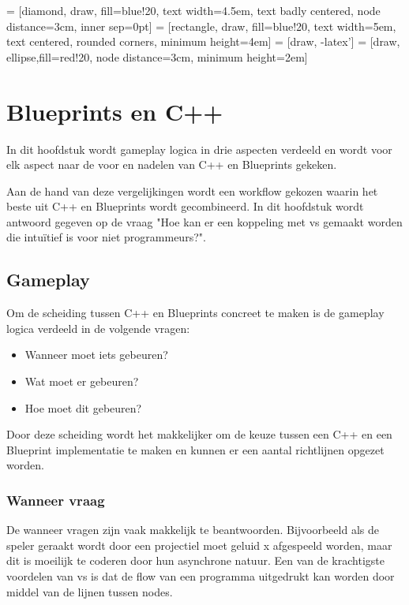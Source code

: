 \lstset {language=C++}
 = [diamond, draw, fill=blue!20, 
    text width=4.5em, text badly centered, node distance=3cm, inner sep=0pt]
 = [rectangle, draw, fill=blue!20, 
    text width=5em, text centered, rounded corners, minimum height=4em]
 = [draw, -latex']
 = [draw, ellipse,fill=red!20, node distance=3cm,
    minimum height=2em]

\chapter{Blueprints en C++}
\label{ch:BlueprintsEnCpp}

In dit hoofdstuk wordt gameplay logica in drie aspecten verdeeld en wordt voor elk aspect naar de voor en nadelen van C++ en Blueprints gekeken.

Aan de hand van deze vergelijkingen wordt een workflow gekozen waarin het beste uit C++ en Blueprints wordt gecombineerd.
In dit hoofdstuk wordt antwoord gegeven op de vraag "Hoe kan er een koppeling met \gls{vs} gemaakt worden die intuïtief is voor niet programmeurs?".

\section{Gameplay}

Om de scheiding tussen C++ en Blueprints concreet te maken is de gameplay logica verdeeld in de volgende vragen:

\begin{itemize}
	\item Wanneer moet iets gebeuren?
	\item Wat moet er gebeuren?
	\item Hoe moet dit gebeuren?
\end{itemize}

Door deze scheiding wordt het makkelijker om de keuze tussen een C++ en een Blueprint implementatie te maken en kunnen er een aantal richtlijnen opgezet worden.

\subsection{Wanneer vraag}
De wanneer vragen zijn vaak makkelijk te beantwoorden. Bijvoorbeeld als de speler geraakt wordt door een projectiel moet geluid x afgespeeld worden, maar dit is moeilijk te coderen door hun asynchrone natuur. Een van de krachtigste voordelen van \gls{vs} is dat de flow van een programma uitgedrukt kan worden door middel van de lijnen tussen nodes. 

